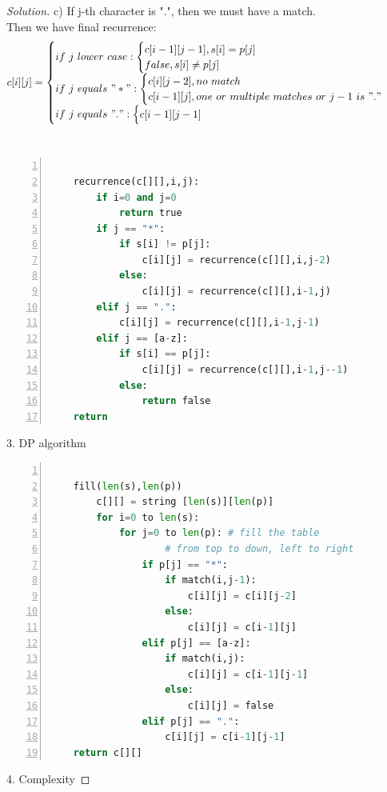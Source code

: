 \documentclass[12pt]{article}
\begin{document}
\begin{proof}[Solution]
	c) If j-th character is ".", then we must have a match.\\
	Then we have final recurrence:
	\begin{equation*}
	c[i][j]=
	\begin{cases}
		if\ j\ lower\ case:\begin{cases}
			c[i-1][j-1], s[i]=p[j]\\
			false, s[i]\ne p[j]
		\end{cases}\\
		if\ j\ equals\ "*":
		\begin{cases}
			c[i][j-2], no\ match\\
			c[i-1][j], one\ or\ multiple\ matches\ or\ j-1\ is\ "."\ \\
		\end{cases}\\
		if\ j\ equals\ ".":
		\begin{cases}
			c[i-1][j-1]
		\end{cases}		
	\end{cases}
	\end{equation*}\\

\begin{lstlisting}[language={python},numbers=left,numberstyle=\tiny,%frame=shadowbox,  
	rulesepcolor=\color{red!20!green!20!blue!20},  
	keywordstyle=\color{blue!70!black},  
	commentstyle=\color{blue!90!},  
	basicstyle=\ttfamily]  

	recurrence(c[][],i,j):
		if i=0 and j=0
			return true
		if j == "*":
			if s[i] != p[j]:
				c[i][j] = recurrence(c[][],i,j-2)
			else:
				c[i][j] = recurrence(c[][],i-1,j)
		elif j == ".":
			c[i][j] = recurrence(c[][],i-1,j-1)
		elif j == [a-z]:
			if s[i] == p[j]:
				c[i][j] = recurrence(c[][],i-1,j--1)
			else:
				return false
	return 
\end{lstlisting}
	3. DP algorithm 
	\begin{lstlisting}[language={python},numbers=left,numberstyle=\tiny,%frame=shadowbox,  
		rulesepcolor=\color{red!20!green!20!blue!20},  
		keywordstyle=\color{blue!70!black},  
		commentstyle=\color{blue!90!},  
		basicstyle=\ttfamily]  
		
	fill(len(s),len(p))
		c[][] = string [len(s)][len(p)]
		for i=0 to len(s):
			for j=0 to len(p): # fill the table 
					# from top to down, left to right
				if p[j] == "*":
					if match(i,j-1):
						c[i][j] = c[i][j-2]
					else:
						c[i][j] = c[i-1][j]
				elif p[j] == [a-z]:
					if match(i,j):
						c[i][j] = c[i-1][j-1]
					else:
						c[i][j] = false
				elif p[j] == ".":
					c[i][j] = c[i-1][j-1]
	return c[][]
	\end{lstlisting}
	4. Complexity
	

\end{proof}
\end{document}
